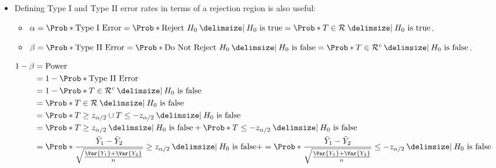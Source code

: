 \begin{itemize}
      \item Defining Type I and Type II error rates in terms of a rejection region is also useful:
            \begin{itemize}
                  \item $ \alpha=\Prob*{\text{Type I Error}}=\Prob*{\text{Reject $ H_0 $}\given \text{$ H_0 $ is true}}=\Prob*{T\in\mathcal{R}\given \text{$ H_0 $ is true}} $.
                  \item $ \beta=\Prob*{\text{Type II Error}}=\Prob*{\text{Do Not Reject $ H_0 $}\given \text{$ H_0 $ is false}}=\Prob*{T\in\mathcal{R}^c\given \text{$ H_0 $ is false}} $.
            \end{itemize}
\end{itemize}
\begin{align*}
      1-\beta
       & =\text{Power}                                                                                                                                                                                                                                    \\
       & =1-\Prob*{\text{Type II Error}}                                                                                                                                                                                                                  \\
       & =1-\Prob*{T\in\mathcal{R}^c\given \text{$ H_0 $ is false}}                                                                                                                                                                                       \\
       & =\Prob*{T\in\mathcal{R}\given \text{$ H_0 $ is false}}                                                                                                                                                                                           \\
       & =\Prob*{T\ge z_{\alpha/2}\cup T\le -z_{\alpha/2}\given \text{$ H_0 $ is false}}                                                                                                                                                                  \\
       & =\Prob*{T\ge z_{\alpha/2}\given \text{$ H_0 $ is false}}+\Prob*{T\le -z_{\alpha/2}\given \text{$ H_0 $ is false}}                                                                                                                                \\
       & =\Prob*{\frac{\bar{Y}_1-\bar{Y}_2}{\sqrt{\frac{\Var{Y_1}+\Var{Y_2}}{n}}}\ge z_{\alpha/2}\given \text{$ H_0 $ is false}}+=\Prob*{\frac{\bar{Y}_1-\bar{Y}_2}{\sqrt{\frac{\Var{Y_1}+\Var{Y_2}}{n}}}\le -z_{\alpha/2}\given \text{$ H_0 $ is false}}
\end{align*}
